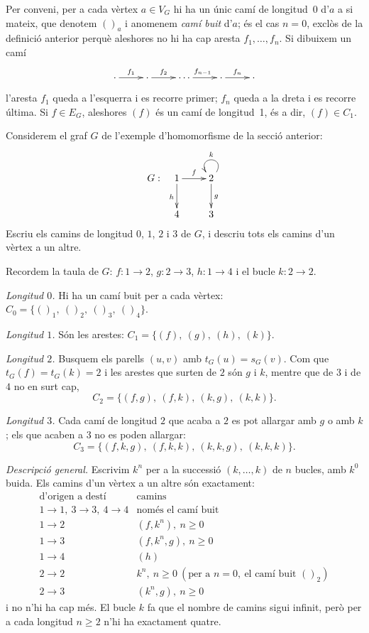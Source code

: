 Per conveni, per a cada vèrtex $a\in V_G$ hi ha un únic camí de longitud~0 d'$a$ a si mateix, que denotem $()_a$ i anomenem \emph{camí buit} d'$a$; és el cas $n=0$, exclòs de la definició anterior perquè aleshores no hi ha cap aresta $f_1,\dots,f_n$. Si dibuixem un camí
\[
\xymatrix{
\cdot \ar[r]^{f_{1}} & \cdot \ar[r]^-{f_{2}} & \cdots \ar[r]^{f_{n-1}} & \cdot \ar[r]^{f_{n}} & \cdot
}
\]
l'aresta $f_1$ queda a l'esquerra i es recorre primer; $f_n$ queda a la dreta i es recorre última. Si $f\in E_G$, aleshores $(f)$ és un camí de longitud~1, és a dir, $(f)\in C_1$.

\begin{exemple}\label{ex:grafs-camins-G}
Considerem el graf $G$ de l'exemple d'homomorfisme de la secció anterior:
\[
G:\ 
\xymatrix{
	1 \ar[d]_{h} \ar[r]^{f} & 2 \ar[d]^{g} \ar@(ur,ul)_{k} \\
	4 & 3
}
\]
Escriu els camins de longitud $0$, $1$, $2$ i $3$ de $G$, i descriu tots els camins d'un vèrtex a un altre.
\end{exemple}
\begin{solucio}
Recordem la taula de $G$: $f\colon 1\to 2$, $g\colon 2\to 3$, $h\colon 1\to 4$ i el bucle $k\colon 2\to 2$.

\emph{Longitud $0$.} Hi ha un camí buit per a cada vèrtex: $C_0=\{()_1,\ ()_2,\ ()_3,\ ()_4\}$.

\emph{Longitud $1$.} Són les arestes: $C_1=\{(f),\ (g),\ (h),\ (k)\}$.

\emph{Longitud $2$.} Busquem els parells $(u,v)$ amb $t_G(u)=s_G(v)$. Com que $t_G(f)=t_G(k)=2$ i les arestes que surten de $2$ són $g$ i $k$, mentre que de $3$ i de $4$ no en surt cap,
\[
C_2=\{(f,g),\ (f,k),\ (k,g),\ (k,k)\}.
\]

\emph{Longitud $3$.} Cada camí de longitud $2$ que acaba a $2$ es pot allargar amb $g$ o amb $k$; els que acaben a $3$ no es poden allargar:
\[
C_3=\{(f,k,g),\ (f,k,k),\ (k,k,g),\ (k,k,k)\}.
\]

\emph{Descripció general.} Escrivim $k^n$ per a la successió $(k,\dots,k)$ de $n$ bucles, amb $k^0$ buida. Els camins d'un vèrtex a un altre són exactament:
\[
\begin{array}{c|l}
\text{d'origen a destí} & \text{camins} \\ \hline
1\to 1,\ 3\to 3,\ 4\to 4 & \text{només el camí buit} \\
1\to 2 & (f,k^n),\ n\geq 0 \\
1\to 3 & (f,k^n,g),\ n\geq 0 \\
1\to 4 & (h) \\
2\to 2 & k^n,\ n\geq 0 \ (\text{per a } n=0,\ \text{el camí buit } ()_2) \\
2\to 3 & (k^n,g),\ n\geq 0
\end{array}
\]
i no n'hi ha cap més. El bucle $k$ fa que el nombre de camins sigui infinit, però per a cada longitud $n\geq 2$ n'hi ha exactament quatre.
\end{solucio}

